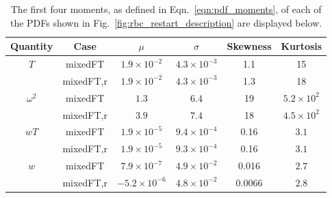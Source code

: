 \documentclass[aps, pre, onecolumn, nofootinbib, notitlepage, groupedaddress, amsfonts, amssymb, amsmath, longbibliography, superscriptaddress]{revtex4-1}
\begin{document}
\begin{table}[t!]
\caption{ 
	The first four moments, as defined in Eqn.~\ref{eqn:pdf_moments}, of each of the PDFs shown in Fig.~\ref{fig:rbc_restart_description} are displayed below.
}
\setlength{\tabcolsep}{12pt}
\label{table:pdf_values}
\begin{center}
\begin{tabularx}{\textwidth}{c c c c c c}
\hline																	
Quantity &	Case	&	$\mu$	&	$\sigma$	&	Skewness	&	Kurtosis \\
\hline
$T$				&	mixedFT		&		$1.9 \times 10^{-2}$	&	$4.3 \times 10^{-3}$	&	1.1		&	15 \\
				&	mixedFT,r	&		$1.9 \times 10^{-2}$	&	$4.3 \times 10^{-3}$	&	1.3		&	18 \\
\hline
$\omega^2$		&	mixedFT		&		$1.3$					&	$6.4$					&	19		&	$5.2 \times 10^2$ \\
				&	mixedFT,r	&		$3.9$					&	$7.4$					&	18		&	$4.5 \times 10^2$ \\
\hline
$wT$			&	mixedFT		&		$1.9 \times 10^{-5}$	&	$9.4 \times 10^{-4}$	&	0.16	&	$3.1$ \\
				&	mixedFT,r	&		$1.9 \times 10^{-5}$	&	$9.3 \times 10^{-4}$	&	0.16	&	$3.1$ \\
\hline
$w$				&	mixedFT		&		$7.9 \times 10^{-7}$	&	$4.9 \times 10^{-2}$	&	0.016	&	$2.7$ \\
				&	mixedFT,r	&		$-5.2 \times 10^{-6}$	&	$4.8 \times 10^{-2}$	&	0.0066	&	$2.8$ \\
\hline																	
\end{tabularx}
\end{center}
\end{table}
\end{document}
